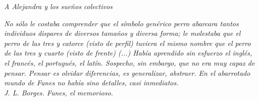 \thispagestyle{empty}
\begin{flushright}
\textit{A Alejandra y los sueños colectivos}
\end{flushright}

\newpage
\thispagestyle{empty}
\begin{flushright}
\textit{No sólo le costaba comprender que el símbolo genérico \textit{perro} abarcara tantos individuos dispares de diversos tamaños y diversa forma; le molestaba que el perro de las tres y catorce (visto de perfil) tuviera el mismo nombre que el perro de las tres y cuarto (visto de frente) (...) Había aprendido sin esfuerzo el inglés, el francés, el portugués, el latín. Sospecho, sin embargo, que no era muy capaz de pensar. Pensar es olvidar diferencias, es generalizar, abstraer. En el abarrotado mundo de Funes no había sino detalles, casi inmediatos.
\\
\medskip
J. L. Borges. Funes, el memorioso.~\cite{funes}
}
\end{flushright}